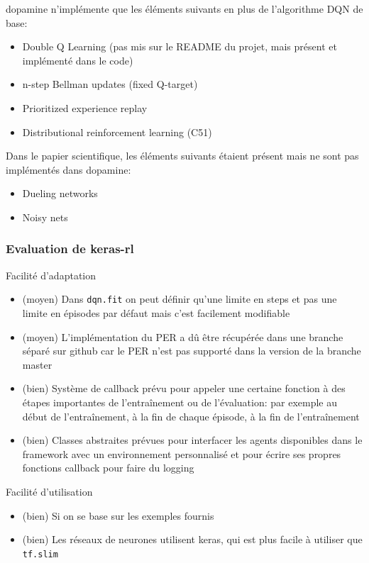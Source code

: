 \documentclass[a4paper,10pt,openany,oneside]{report}
\begin{document}
dopamine n'implémente que les éléments suivants en plus de l'algorithme DQN de base:
\begin{itemize}
	\item Double Q Learning (pas mis sur le README du projet, mais présent et implémenté dans le code)
	\item n-step Bellman updates (fixed Q-target)
	\item Prioritized experience replay
	\item Distributional reinforcement learning (C51)
\end{itemize}
Dans le papier scientifique, les éléments suivants étaient présent mais ne sont pas implémentés dans dopamine:
\begin{itemize}
	\item Dueling networks
	\item Noisy nets
\end{itemize}

\subsubsection*{Evaluation de keras-rl}
Facilité d'adaptation
\begin{itemize}
	\item (moyen) Dans \lstinline{dqn.fit} on peut définir qu'une limite en steps et pas une limite en épisodes par défaut mais c'est facilement modifiable
	\item (moyen) L'implémentation du PER a dû être récupérée dans une branche séparé sur github car le PER n'est pas supporté dans la version de la branche master
	\item (bien) Système de callback prévu pour appeler une certaine fonction à des étapes importantes de l'entraînement ou de l'évaluation: par exemple au début de l'entraînement, à la fin de chaque épisode, à la fin de l'entraînement
	\item (bien) Classes abstraites prévues pour interfacer les agents disponibles dans le framework avec un environnement personnalisé et pour écrire ses propres fonctions callback pour faire du logging
\end{itemize}

Facilité d'utilisation
\begin{itemize}
	\item (bien) Si on se base sur les exemples fournis
	\item (bien) Les réseaux de neurones utilisent keras, qui est plus facile à utiliser que \lstinline{tf.slim}
\end{itemize}
\end{document}
